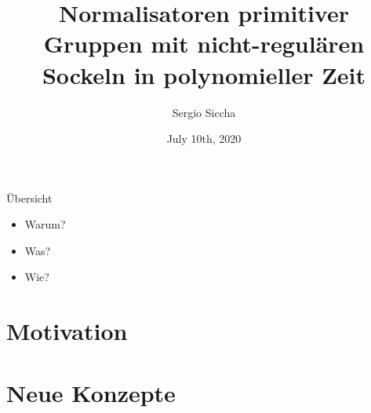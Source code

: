 \documentclass{beamer}
\title{Normalisatoren primitiver Gruppen mit nicht-regulären
Sockeln in polynomieller Zeit}
\date{July 10th, 2020}
\author{Sergio Siccha}
\theoremstyle{plain}
\theoremstyle{definition}
\begin{document}
\maketitle
{}

\begin{frame}{Übersicht}
\begin{itemize}
\setlength{\itemsep}{\fill}
\item Warum?
\item Was?
\item Wie?
\end{itemize}
\end{frame}

\section{Motivation}


\section{Neue Konzepte}

\end{document}
